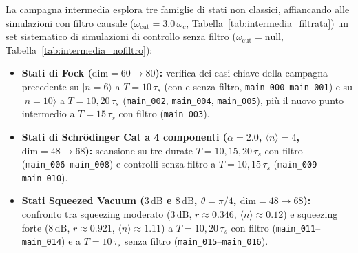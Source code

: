 \documentclass[11pt,a4paper]{article}
\begin{document}
\noindent
La campagna intermedia esplora tre famiglie di stati non classici, affiancando alle simulazioni con filtro causale ($\omega_{\text{cut}} = 3.0\,\omega_c$, Tabella~\ref{tab:intermedia_filtrata}) un set sistematico di simulazioni di controllo senza filtro ($\omega_{\text{cut}} = \text{null}$, Tabella~\ref{tab:intermedia_nofiltro}):
\begin{itemize}
    \item \textbf{Stati di Fock ($\text{dim}=60 \to 80$):} verifica dei casi chiave della campagna precedente su $|n=6\rangle$ a $T=10\,\tau_s$ (con e senza filtro, \texttt{main\_000}--\texttt{main\_001}) e su $|n=10\rangle$ a $T=10, 20\,\tau_s$ (\texttt{main\_002}, \texttt{main\_004}, \texttt{main\_005}), più il nuovo punto intermedio a $T = 15\,\tau_s$ con filtro (\texttt{main\_003}).
    \item \textbf{Stati di Schrödinger Cat a 4 componenti ($\alpha = 2.0$, $\langle n \rangle = 4$, $\text{dim}=48 \to 68$):} scansione su tre durate $T = 10, 15, 20\,\tau_s$ con filtro (\texttt{main\_006}--\texttt{main\_008}) e controlli senza filtro a $T = 10, 15\,\tau_s$ (\texttt{main\_009}--\texttt{main\_010}).
    \item \textbf{Stati Squeezed Vacuum ($3\,\text{dB}$ e $8\,\text{dB}$, $\theta = \pi/4$, $\text{dim}=48 \to 68$):} confronto tra squeezing moderato ($3\,\text{dB}$, $r \approx 0.346$, $\langle n\rangle \approx 0.12$) e squeezing forte ($8\,\text{dB}$, $r \approx 0.921$, $\langle n\rangle \approx 1.11$) a $T = 10, 20\,\tau_s$ con filtro (\texttt{main\_011}--\texttt{main\_014}) e a $T = 10\,\tau_s$ senza filtro (\texttt{main\_015}--\texttt{main\_016}).
\end{itemize}
\end{document}
